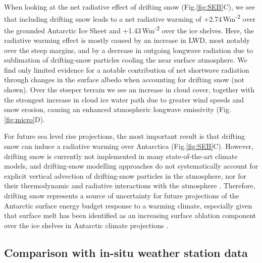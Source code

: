 \documentclass[draft]{agujournal2019}
\begin{document}

When looking at the net radiative effect of drifting snow (Fig.\ref{fig:SEB}C), we see that including drifting snow leads to a net radiative warming of +2.74\,Wm\textsuperscript{-2} over the grounded Antarctic Ice Sheet and +1.43\,Wm\textsuperscript{-2} over the ice shelves. Here, the radiative warming effect is mostly caused by an increase in LWD, most notably over the steep margins, and by a decrease in outgoing longwave radiation due to sublimation of drifting-snow particles cooling the near surface atmosphere. We find only limited evidence for a notable contribution of net shortwave radiation through changes in the surface albedo when accounting for drifting snow (not shown). Over the steeper terrain we see an increase in cloud cover, together with the strongest increase in cloud ice water path due to greater wind speeds and snow erosion, causing an enhanced atmospheric longwave emissivity (Fig.\ref{fig:micro}D).

For future sea level rise projections, the most important result is that drifting snow can induce a radiative warming over Antarctica (Fig.\ref{fig:SEB}C). However, drifting snow is currently not implemented in many state-of-the-art climate models, and drifting-snow modelling approaches do not systematically account for explicit vertical advection of drifting-snow particles in the atmosphere, nor for their thermodynamic and radiative interactions with the atmosphere \cite{Lenaerts2012a}. Therefore, drifting snow represents a source of uncertainty for future projections of the Antarctic surface energy budget response to a warming climate, especially given that surface melt has been identified as an increasing surface ablation component over the ice shelves in Antarctic climate projections \cite{Kittel2021}.

\subsection{Comparison with in-situ weather station data}
\end{document}
